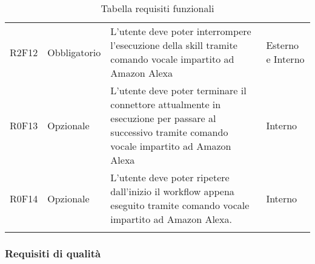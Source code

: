 \begin{center}
\begin{longtable}{  >{\RaggedRight}p{2.5cm}  
						>{\RaggedRight}p{2.1cm} 
						>{\RaggedRight}p{7cm}  
						>{\RaggedRight}p{1.7cm} 
						}
		R2F12	& Obbligatorio	& L'utente deve poter interrompere l'esecuzione della skill tramite comando vocale impartito ad Amazon Alexa	& Esterno e Interno \\
		R0F13	& Opzionale	& L'utente deve poter terminare il connettore attualmente in esecuzione per passare al successivo tramite comando vocale impartito ad Amazon Alexa	& Interno \\
		R0F14	& Opzionale & L'utente deve poter ripetere dall'inizio il workflow appena eseguito tramite comando vocale impartito ad Amazon Alexa. & Interno \\ 
		\rowcolor{white}
		\caption{Tabella requisiti funzionali}
	\end{longtable}
\end{center}

\subsubsection{Requisiti di qualità}
